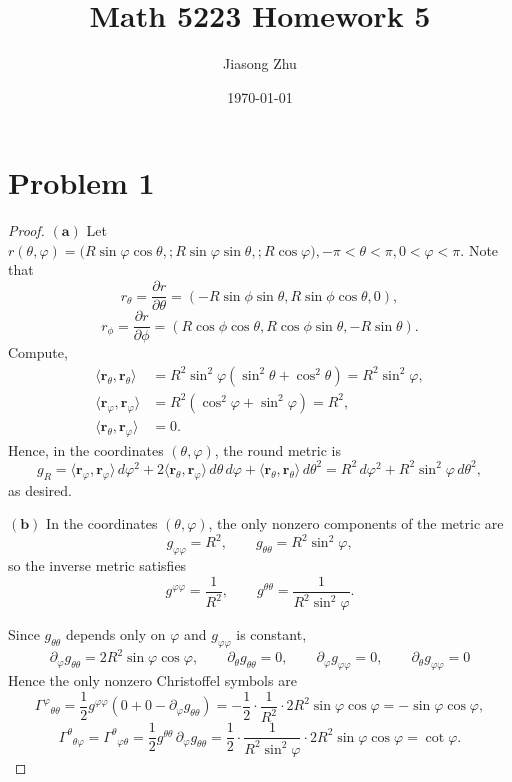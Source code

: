 \documentclass[12pt]{article}
\title{Math 5223 Homework 5}
\author{Jiasong Zhu}
\date{\today}
\begin{document}
\maketitle
\section*{Problem 1}
\begin{proof}
    $\mathbf{(a)}$ Let $r(\theta,\varphi)=\big(R\sin\varphi\cos\theta,; R\sin\varphi\sin\theta,; R\cos\varphi\big),
  -\pi<\theta<\pi, 0<\varphi<\pi.$ Note that 
  $$
  r_\theta=\frac{\partial r}{\partial \theta}=(-R\sin\phi\sin\theta,R\sin\phi\cos\theta,0),
  $$
  $$
  r_\phi=\frac{\partial r}{\partial \phi}=(R\cos\phi\cos\theta,R\cos\phi\sin\theta,-R\sin\theta).
  $$
  Compute, 
  \begin{align*}
\langle \mathbf r_\theta,\mathbf r_\theta\rangle
&=R^2\sin^2\varphi(\sin^2\theta+\cos^2\theta)=R^2\sin^2\varphi,\\
\langle \mathbf r_\varphi,\mathbf r_\varphi\rangle
&=R^2(\cos^2\varphi+\sin^2\varphi)=R^2,\\
\langle \mathbf r_\theta,\mathbf r_\varphi\rangle&=0.
\end{align*}
Hence, in the coordinates \((\theta,\varphi)\), the round metric is
\[
g_R
=\langle \mathbf r_\varphi,\mathbf r_\varphi\rangle\, d\varphi^2
+2\langle \mathbf r_\theta,\mathbf r_\varphi\rangle\, d\theta\, d\varphi
+\langle \mathbf r_\theta,\mathbf r_\theta\rangle\, d\theta^2
=R^2\, d\varphi^2+R^2\sin^2\varphi\, d\theta^2,
\]
as desired.

$\mathbf{(b)}$ In the coordinates \((\theta,\varphi)\), the only nonzero components of the metric are
\[
g_{\varphi\varphi}=R^2,\qquad g_{\theta\theta}=R^2\sin^2\varphi,
\]
so the inverse metric satisfies
\[
g^{\varphi\varphi}=\frac{1}{R^2},\qquad g^{\theta\theta}=\frac{1}{R^2\sin^2\varphi}.
\]

Since \(g_{\theta\theta}\) depends only on \(\varphi\) and \(g_{\varphi\varphi}\) is constant,
\[
\partial_\varphi g_{\theta\theta}=2R^2\sin\varphi\cos\varphi,\qquad
\partial_\theta g_{\theta\theta}=0,\qquad
\partial_\varphi g_{\varphi\varphi}=0,\qquad
\partial_\theta g_{\varphi\varphi}=0
\]
Hence the only nonzero Christoffel symbols are
\[
\Gamma^{\varphi}{}_{\theta\theta}
=\frac{1}{2}g^{\varphi\varphi}\!\left(0+0-\partial_\varphi g_{\theta\theta}\right)
=-\frac{1}{2}\cdot\frac{1}{R^2}\cdot 2R^2\sin\varphi\cos\varphi
=-\sin\varphi\cos\varphi,
\]
\[
\Gamma^{\theta}{}_{\theta\varphi}
=\Gamma^{\theta}{}_{\varphi\theta}
=\frac{1}{2}g^{\theta\theta}\,\partial_\varphi g_{\theta\theta}
=\frac{1}{2}\cdot\frac{1}{R^2\sin^2\varphi}\cdot 2R^2\sin\varphi\cos\varphi
=\cot\varphi.
\]


\end{proof}
\end{document}
